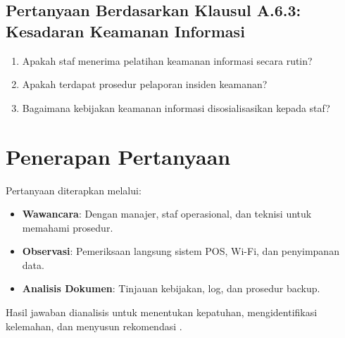 \documentclass[12pt, a4paper]{report}
\begin{document}
\subsection{Pertanyaan Berdasarkan Klausul A.6.3: Kesadaran Keamanan Informasi}
\begin{enumerate}
    \item Apakah staf menerima pelatihan keamanan informasi secara rutin?
    \item Apakah terdapat prosedur pelaporan insiden keamanan?
    \item Bagaimana kebijakan keamanan informasi disosialisasikan kepada staf? \citep{pratama2022pelatihan}
\end{enumerate}

\section{Penerapan Pertanyaan}
Pertanyaan diterapkan melalui:
\begin{itemize}
    \item \textbf{Wawancara}: Dengan manajer, staf operasional, dan teknisi untuk memahami prosedur.
    \item \textbf{Observasi}: Pemeriksaan langsung sistem POS, Wi-Fi, dan penyimpanan data.
    \item \textbf{Analisis Dokumen}: Tinjauan kebijakan, log, dan prosedur backup.
\end{itemize}
Hasil jawaban dianalisis untuk menentukan kepatuhan, mengidentifikasi kelemahan, dan menyusun rekomendasi \citep{frangky2024implementasi}.
\end{document}
